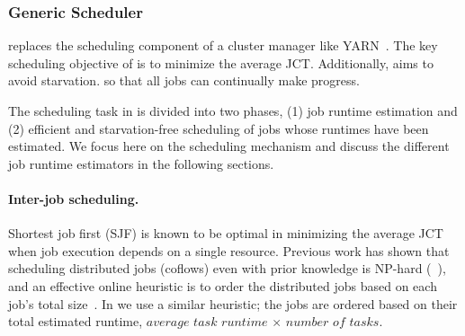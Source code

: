 
\subsubsection{Generic Scheduler \gs}
\label{sec:design:gs}

\gs replaces the scheduling component of a cluster manager like YARN~\cite{yarn:web}. 
The key scheduling objective of \gs is to minimize the average JCT.
Additionally, \gs aims to avoid starvation.
\rm{so that all jobs can continually make progress.}

The scheduling task in \gs is divided into two phases, (1) job runtime estimation
and (2) efficient and starvation-free scheduling of jobs whose runtimes have been
estimated. 
We focus here on the scheduling mechanism 
and discuss the different job runtime estimators in the following sections.


\paragraph{Inter-job scheduling. }
Shortest job first (SJF) is known to be optimal in minimizing the average JCT
when job execution depends on a single resource.
Previous work has shown
that scheduling distributed jobs (\eg coflows) even with prior knowledge is NP-hard (\eg~\cite{varys:sigcomm14}),
and an effective online heuristic is to order the distributed jobs
based on each job's total size~\cite{aalo:sigcomm15}.
{In \gs we use} a similar heuristic;
the jobs are ordered based on their total estimated runtime, \ie $average$ $task$ $runtime$
$\times$ $number$ $of$ $tasks$.

